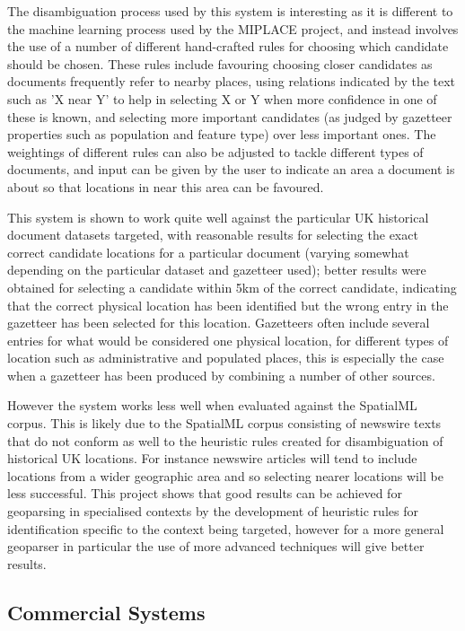 \documentclass[12pt, a4paper]{report}
\begin{document}
The disambiguation process used by this system is interesting as it is different to the machine learning process used by the MIPLACE project, and instead involves the use of a number of different hand-crafted rules for choosing which candidate should be chosen. These rules include favouring choosing closer candidates as documents frequently refer to nearby places, using relations indicated by the text such as 'X near Y' to help in selecting X or Y when more confidence in one of these is known, and selecting more important candidates (as judged by gazetteer properties such as population and feature type) over less important ones. The weightings of different rules can also be adjusted to tackle different types of documents, and input can be given by the user to indicate an area a document is  about so that locations in near this area can be favoured.

This system is shown to work quite well against the particular UK historical document datasets targeted, with reasonable results for selecting the exact correct candidate locations for a particular document (varying somewhat depending on the particular dataset and gazetteer used); better results were obtained for selecting a candidate within 5km of the correct candidate, indicating that the correct physical location has been identified but the wrong entry in the gazetteer has been selected for this location. Gazetteers often include several entries for what would be considered one physical location, for different types of location such as administrative and populated places, this is especially the case when a gazetteer has been produced by combining a number of other sources.

However the system works less well when evaluated against the SpatialML corpus. This is likely due to the SpatialML corpus consisting of newswire texts that do not conform as well to the heuristic rules created for disambiguation of historical UK locations. For instance newswire articles will tend to include locations from a wider geographic area and so selecting nearer locations will be less successful. This project shows that good results can be achieved for geoparsing in specialised contexts by the development of heuristic rules for identification specific to the context being targeted, however for a more general geoparser in particular the use of more advanced techniques will give better results.

\subsection{Commercial Systems}
\label{subsec:commercial_systems}
\end{document}
